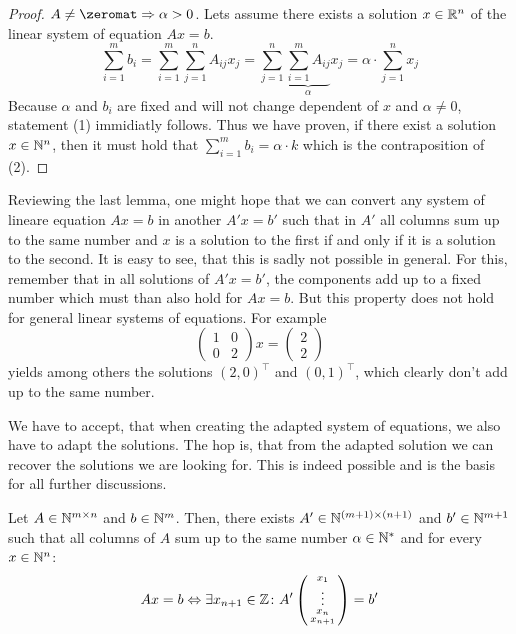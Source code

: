 \begin{proof}
    $A \neq \zeromat \Rightarrow \alpha > 0$. Lets assume there exists a solution $x \in \mathbb{R}^n$ of the linear system of equation $Ax=b$.
    $$\sum_{i=1}^m b_i = \sum_{i=1}^{m}\sum_{j=1}^{n}A_{ij} x_j = \sum_{j=1}^{n}\underbrace{\sum_{i=1}^{m}A_{ij}}_\alpha x_j = \alpha \cdot \sum_{j=1}^{n}x_j$$
    Because $\alpha$ and $b_i$ are fixed and will not change dependent of $x$ and $\alpha \neq 0$, statement (1) immidiatly follows. Thus we have proven, if there exist a solution $x \in \mathbb{N}^n$, then it must hold that $\sum_{i=1}^{m}b_i = \alpha \cdot k$ which is the contraposition of (2).
\end{proof}
Reviewing the last lemma, one might hope that we can convert any system of lineare equation $Ax = b$ in another $A'x = b'$ such that in $A'$ all columns sum up to the same number and $x$ is a solution to the first if and only if it is a solution to the second. It is easy to see, that this is sadly not possible in general. For this, remember that in all solutions of $A'x=b'$, the components add up to a fixed number which must than also hold for $Ax=b$. But this property does not hold for general linear systems of equations. For example
$$
\left(\begin{matrix}
    1 & 0\\
    0 & 2
\end{matrix}\right)
x = \left(\begin{matrix}
    2\\2
\end{matrix}\right)
$$
yields among others the solutions $(2, 0)^\top$ and $(0, 1)^\top$, which clearly don't add up to the same number. 

We have to accept, that when creating the adapted system of equations, we also have to adapt the solutions. The hop is, that from the adapted solution we can recover the solutions we are looking for. This is indeed possible and is the basis for all further discussions.

\begin{theorem}
    Let $A\in \mathbb{N}^{m \times n}$ and $b \in \mathbb{N}^m$. Then, there exists $A' \in \mathbb{N}^{(m+1) \times (n+1)}$ and $b' \in \mathbb{N}^{m+1}$ such that all columns of $A$ sum up to the same number $\alpha \in \mathbb{N}^*$ and for every $x \in \mathbb{N}^n$:
    $$Ax = b \Leftrightarrow \exists x_{n+1}\in \mathbb{Z}\colon A' \left(\begin{smallmatrix}
        x_1\\
        \vdots\\
        x_n\\
        x_{n+1}
    \end{smallmatrix}\right) = b'$$
\end{theorem}

